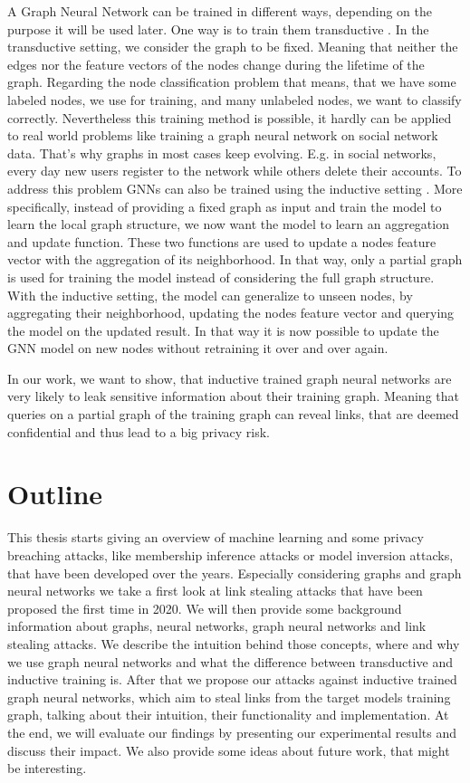 		A Graph Neural Network can be trained in different ways, depending on the purpose it will be used later.
		One way is to train them transductive \cite{5206871, ZHA2010187, WANG2017218, 10.1007/978-3-642-04174-7_29}.
		In the transductive setting, we consider the graph to be fixed.
		Meaning that neither the edges nor the feature vectors of the nodes change during the lifetime of the graph.
		Regarding the node classification problem that means, that we have some labeled nodes, we use for training, and many unlabeled nodes, we want to classify correctly.
		Nevertheless this training method is possible, it hardly can be applied to real world problems like training a graph neural network on social network data.
		That's why graphs in most cases keep evolving.
		E.g. in social networks, every day new users register to the network while others delete their accounts.
		To address this problem GNNs can also be trained using the inductive setting \cite{zeng2020graphsaint, 8519335, zhang2020document}.
		More specifically, instead of providing a fixed graph as input and train the model to learn the local graph structure, we now want the model to learn an aggregation and update function.
		These two functions are used to update a nodes feature vector with the aggregation of its neighborhood.
		In that way, only a partial graph is used for training the model instead of considering the full graph structure.
		With the inductive setting, the model can generalize to unseen nodes, by aggregating their neighborhood, updating the nodes feature vector and querying the model on the updated result.
		In that way it is now possible to update the GNN model on new nodes without retraining it over and over again.

		In our work, we want to show, that inductive trained graph neural networks are very likely to leak sensitive information about their training graph. 
		Meaning that queries on a partial graph of the training graph can reveal links, that are deemed confidential and thus lead to a big privacy risk.

	\section{Outline}
		This thesis starts giving an overview of machine learning and some privacy breaching attacks, like membership inference attacks or model inversion attacks, that have been developed over the years.
		Especially considering graphs and graph neural networks we take a first look at link stealing attacks that have been proposed the first time in 2020.
		We will then provide some background information about graphs, neural networks, graph neural networks and link stealing attacks.
		We describe the intuition behind those concepts, where and why we use graph neural networks and what the difference between transductive and inductive training is.
		After that we propose our attacks against inductive trained graph neural networks, which aim to steal links from the target models training graph, talking about their intuition, their functionality and implementation.
		At the end, we will evaluate our findings by presenting our experimental results and discuss their impact.
		We also provide some ideas about future work, that might be interesting.